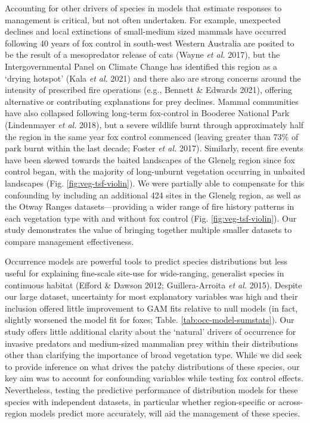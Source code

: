 \documentclass[11pt,a4paper,titlepage,twoside,openright]{style/unimelbthesis}
\begin{document}
\begin{mainmatter}
Accounting for other drivers of species in models that estimate responses to management is critical, but not often undertaken. For example, unexpected declines and local extinctions of small-medium sized mammals have occurred following 40 years of fox control in south-west Western Australia are posited to be the result of a mesopredator release of cats (Wayne \emph{et al.} 2017), but the Intergovernmental Panel on Climate Change has identified this region as a `drying hotspot' (Kala \emph{et al.} 2021) and there also are strong concerns around the intensity of prescribed fire operations (e.g., Bennett \& Edwards 2021), offering alternative or contributing explanations for prey declines. Mammal communities have also collapsed following long-term fox-control in Booderee National Park (Lindenmayer \emph{et al.} 2018), but a severe wildlife burnt through approximately half the region in the same year fox control commenced (leaving greater than 73\% of park burnt within the last decade; Foster \emph{et al.} 2017). Similarly, recent fire events have been skewed towards the baited landscapes of the Glenelg region since fox control began, with the majority of long-unburnt vegetation occurring in unbaited landscapes (Fig. \ref{fig:veg-tsf-violin}). We were partially able to compensate for this confounding by including an additional 424 sites in the Glenelg region, as well as the Otway Ranges datasets---providing a wider range of fire history patterns in each vegetation type with and without fox control (Fig. \ref{fig:veg-tsf-violin}). Our study demonstrates the value of bringing together multiple smaller datasets to compare management effectiveness.

Occurrence models are powerful tools to predict species distributions but less useful for explaining fine-scale site-use for wide-ranging, generalist species in continuous habitat (Efford \& Dawson 2012; Guillera-Arroita \emph{et al.} 2015). Despite our large dataset, uncertainty for most explanatory variables was high and their inclusion offered little improvement to GAM fits relative to null models (in fact, slightly worsened the model fit for foxes; Table. \ref{tab:occ-model-sumstats}). Our study offers little additional clarity about the `natural' drivers of occurrence for invasive predators and medium-sized mammalian prey within their distributions other than clarifying the importance of broad vegetation type. While we did seek to provide inference on what drives the patchy distributions of these species, our key aim was to account for confounding variables while testing fox control effects. Nevertheless, testing the predictive performance of distribution models for these species with independent datasets, in particular whether region-specific or across-region models predict more accurately, will aid the management of these species.


\end{mainmatter}
\end{document}
